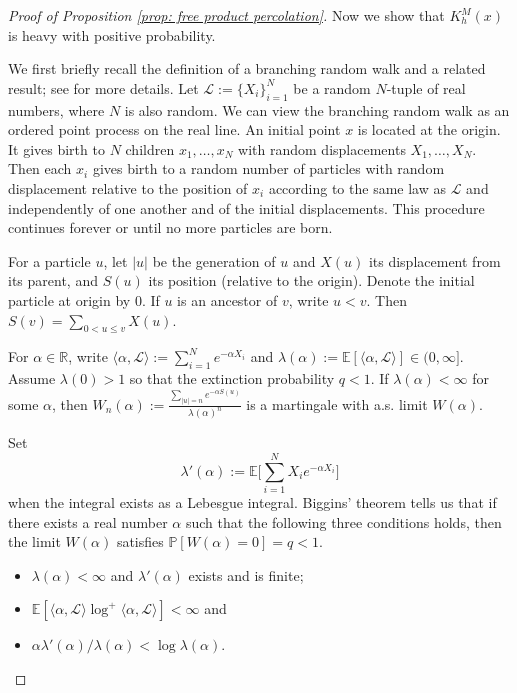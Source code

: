 \documentclass[12pt]{article}
\numberwithin{equation}{section}
\newcommand{\1}{\mathbf{1}}
\begin{document}
\begin{proof}[Proof of Proposition \ref{prop: free product percolation}]
	Now we show that $K_h^M(x)$ is heavy with positive probability.
	
	We first briefly recall the definition of a branching random walk and a related result; see \cite{Lyons1997} for more details. Let $\mathcal{L}:=\{X_i\}_{i=1}^{N}$ be a random $N$-tuple of real numbers, where $N$ is also random. We can view the branching random walk as an ordered point process on the real line. An initial point $x$ is located at the origin. It gives birth to $N$ children $x_1,\ldots,x_N$ with random displacements $X_1,\ldots,X_N$. Then each $x_i$ gives birth to a random number of particles with random displacement relative to the position of $x_i$ according to the same law as $\mathcal{L}$ and independently of one another and of the initial displacements. This procedure continues forever or until no more particles are born. 
	
	For a particle $u$, let $|u|$ be the generation of $u$ and $X(u)$ its displacement from its parent, and $S(u)$  its position (relative to the origin). Denote the initial particle at origin by $0$. If $u$ is an ancestor of $v$, write $u<v$. Then $S(v)=\sum_{0<u\leq v}{X(u)}$. 
	
	For $\alpha\in\mathbb{R}$, write $\langle \alpha,\mathcal{L}\rangle:=\sum_{i=1}^{N}e^{-\alpha X_i}$ and $\lambda(\alpha):=\mathbb{E}[\langle \alpha,\mathcal{L}\rangle]\in (0,\infty]$. Assume $\lambda(0)>1$ so that the extinction probability $q<1$. If $\lambda(\alpha)<\infty$ for some $\alpha$, then $W_n(\alpha):=\frac{\sum_{|u|=n}{e^{-\alpha S(u)}}}{\lambda(\alpha)^n}$ is a martingale with a.s. limit $W(\alpha)$. 
	
	
	Set 
	\[
	\lambda'(\alpha):=\mathbb{E}\Big[\sum_{i=1}^{N}X_ie^{-\alpha X_i}\Big]
	\]
	when the integral exists as a Lebesgue integral. Biggins' theorem tells us that if there exists a real number $\alpha$ such that the following three conditions holds, then the limit $W(\alpha)$ satisfies $\mathbb{P}[W(\alpha)=0]=q<1$.
	
	\begin{itemize}
		\item [$(1)$] $\lambda(\alpha)<\infty$ and $\lambda'(\alpha)$ exists and is finite;
		\item[$(2)$] $\mathbb{E}[\langle \alpha,\mathcal{L}\rangle\log ^+\langle \alpha,\mathcal{L}\rangle]<\infty$ and 
		\item[$(3)$] $\alpha\lambda'(\alpha)/\lambda(\alpha)<\log \lambda(\alpha)$.
	\end{itemize} 


\end{proof}
\end{document}
